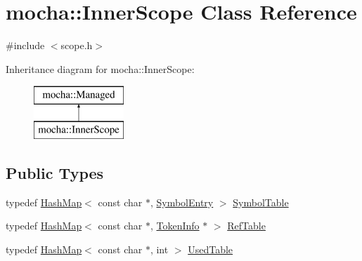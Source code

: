 \hypertarget{classmocha_1_1_inner_scope}{
\section{mocha::InnerScope Class Reference}
\label{classmocha_1_1_inner_scope}
}


{\ttfamily \#include $<$scope.h$>$}

Inheritance diagram for mocha::InnerScope:\begin{figure}[H]
\begin{center}
\leavevmode
\includegraphics[height=2.000000cm]{classmocha_1_1_inner_scope}
\end{center}
\end{figure}
\subsection*{Public Types}
\begin{DoxyCompactItemize}
\item 
typedef \hyperlink{classmocha_1_1_hash_map}{HashMap}$<$ const char $\ast$, \hyperlink{namespacemocha_a692c3ca38973da32760e114599b8a960}{SymbolEntry} $>$ \hyperlink{classmocha_1_1_inner_scope_a3f079c85dc578eebbf20fe66f5755713}{SymbolTable}
\item 
typedef \hyperlink{classmocha_1_1_hash_map}{HashMap}$<$ const char $\ast$, \hyperlink{classmocha_1_1_token_info}{TokenInfo} $\ast$ $>$ \hyperlink{classmocha_1_1_inner_scope_ab9e4fc61cd423f1682a03867d1c26537}{RefTable}
\item 
typedef \hyperlink{classmocha_1_1_hash_map}{HashMap}$<$ const char $\ast$, int $>$ \hyperlink{classmocha_1_1_inner_scope_a106f6bc108fa8e844f0d2575f85c8c56}{UsedTable}
\end{DoxyCompactItemize}
